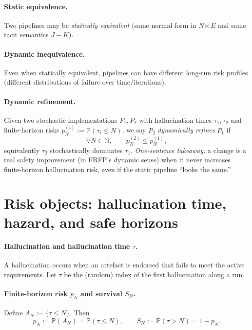 \paragraph{Static equivalence.}
Two pipelines may be \emph{statically equivalent} (same normal form in $N \ltimes E$ and same tacit
semantics $J{-}K$).

\paragraph{Dynamic inequivalence.}
Even when statically equivalent, pipelines can have different long-run risk profiles (different
distributions of failure over time/iterations).

\paragraph{Dynamic refinement.}
Given two stochastic implementations $P_1, P_2$ with hallucination times $\tau_1, \tau_2$ and finite-horizon
risks $p^{(i)}_N := \mathbb{P}(\tau_i \le N)$, we say $P_2$ \emph{dynamically refines} $P_1$ if
\[
\forall N \in \mathbb{N},\qquad p^{(2)}_N \le p^{(1)}_N,
\]
equivalently $\tau_2$ stochastically dominates $\tau_1$.
\emph{One-sentence takeaway:} a change is a real safety improvement (in FRFP’s dynamic sense) when it
never increases finite-horizon hallucination risk, even if the static pipeline ``looks the same.''

\section{Risk objects: hallucination time, hazard, and safe horizons}
\label{sec:lookup-risk}

\paragraph{Hallucination and hallucination time $\tau$.}
A hallucination occurs when an artefact is endorsed that fails to meet the active requirements.
Let $\tau$ be the (random) index of the first hallucination along a run.

\paragraph{Finite-horizon risk $p_N$ and survival $S_N$.}
Define $A_N := \{\tau \le N\}$. Then
\[
p_N := \mathbb{P}(A_N) = \mathbb{P}(\tau \le N),
\qquad
S_N := \mathbb{P}(\tau > N) = 1 - p_N.
\]

